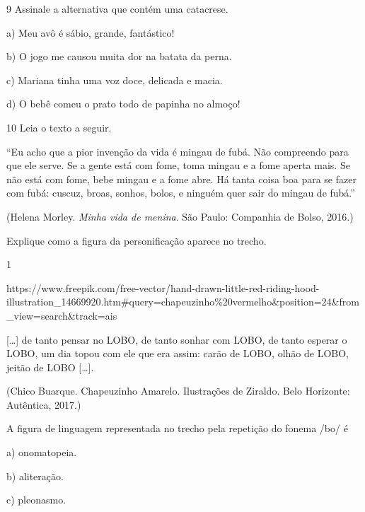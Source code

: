 \num{9} Assinale a alternativa que contém uma catacrese.

a) Meu avô é sábio, grande, fantástico!

b) O jogo me causou muita dor na batata da perna.

c) Mariana tinha uma voz doce, delicada e macia.

d) O bebê comeu o prato todo de papinha no almoço!


\num{10} Leia o texto a seguir.

``Eu acho que a pior invenção da vida é mingau de fubá. Não compreendo
para que ele serve. Se a gente está com fome, toma mingau e a fome
aperta mais. Se não está com fome, bebe mingau e a fome abre. Há tanta
coisa boa para se fazer com fubá: cuscuz, broas, sonhos, bolos, e
ninguém quer sair do mingau de fubá.''

(Helena Morley. \emph{Minha vida de menina}. São Paulo: Companhia de
Bolso, 2016.)

Explique como a figura da personificação aparece no trecho.




\num{1}

https://www.freepik.com/free-vector/hand-drawn-little-red-riding-hood-illustration\_14669920.htm\#query=chapeuzinho\%20vermelho\&position=24\&from\_view=search\&track=ais

{[}\ldots{]} de tanto pensar no LOBO, de tanto sonhar com LOBO, de tanto
esperar o LOBO, um dia topou com ele que era assim: carão de LOBO, olhão
de LOBO, jeitão de LOBO {[}\ldots{]}.

(Chico Buarque. Chapeuzinho Amarelo. Ilustrações de Ziraldo. Belo
Horizonte: Autêntica, 2017.)

A figura de linguagem representada no trecho pela repetição do fonema
/bo/ é

a) onomatopeia.

b) aliteração.

c) pleonasmo.

